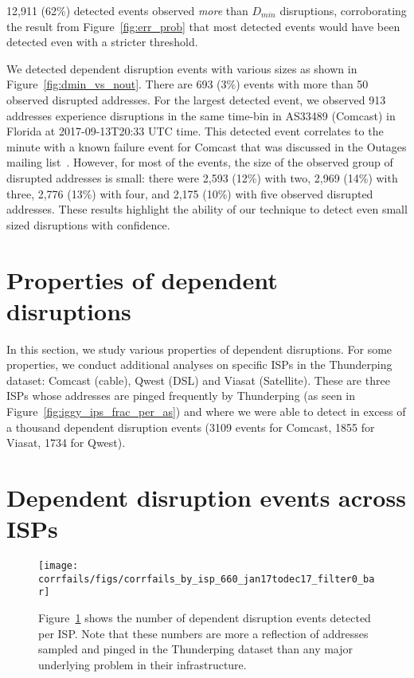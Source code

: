 12,911 (62\%) detected events observed \emph{more} than $D_{min}$
disruptions, corroborating the result from Figure~\ref{fig:err_prob}
that most detected events would have been detected even with a
stricter threshold. 

We detected dependent disruption events with various sizes as shown in
Figure~\ref{fig:dmin_vs_nout}. There are
693 (3\%) events with more than 50 observed disrupted addresses. For the largest
detected event, we observed 913 addresses experience disruptions in
the same time-bin in AS33489 (Comcast) in
Florida at 2017-09-13T20:33 UTC time. This detected event correlates
to the minute with a known failure event for Comcast
that was discussed in the Outages mailing list~\cite{comcast-sep-13-2017-large-outage-mailinglist}. However, for most of the events, the size of the observed
group of disrupted addresses is small: there were 2,593 (12\%)
with two, 2,969 (14\%) with three, 2,776 (13\%) with four, and 2,175
(10\%) with five observed disrupted addresses. These results highlight the
ability of our technique to detect even small sized disruptions with
confidence.


\section{Properties of dependent disruptions}

In this section, we study various properties of dependent
disruptions. For some properties, we conduct additional analyses on
specific ISPs in the Thunderping dataset: Comcast (cable), Qwest (DSL)
and Viasat (Satellite). These are three ISPs whose addresses are
pinged frequently by Thunderping (as seen in
Figure~\ref{fig:iggy_ips_frac_per_as})
and where we were able to
detect in excess of a thousand dependent disruption events (3109
events for Comcast, 1855 for Viasat, 1734 for Qwest).

\section{Dependent disruption events across ISPs}

\label{sec:corrfails_by_isp}


\begin{figure}[t]
\centering
\texttt{[image: corrfails/figs/corrfails\_by\_isp\_660\_jan17todec17\_filter0\_bar]}
\caption{
\label{fig:corrfails_across_isps}
Figure~\ref{fig:corrfails_across_isps} shows the number of
dependent disruption events detected per ISP. Note that these numbers
are more a reflection of addresses sampled and pinged in the
Thunderping dataset than any major underlying problem in their
infrastructure.}
\end{figure}

